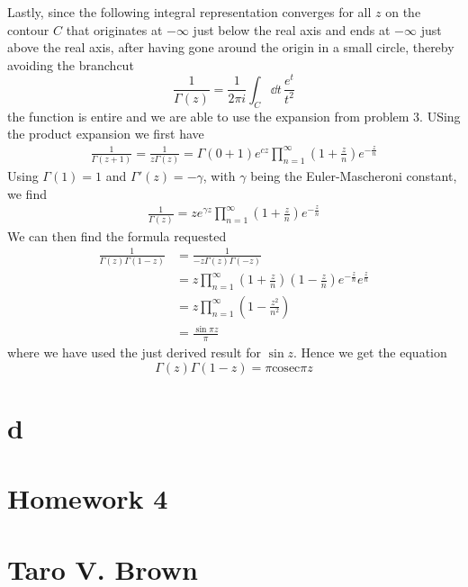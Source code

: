 \documentclass[a4paper,12pt]{article}
\begin{document}
Lastly, since the following integral representation converges for all $z$ on the contour $C$ that originates at $-\infty$ just below the real axis and ends at $-\infty$ just above the real axis, after having gone around the origin in a small circle, thereby avoiding the branchcut
\begin{equation}
\frac{1}{\Gamma(z)}=\frac{1}{2\pi i}\int_C\dd t\, \frac{e^t}{t^2}
\end{equation}
the function is entire and we are able to use the expansion from problem 3. USing the product expansion we first have
\begin{equation}
\begin{aligned}
\frac{1}{\Gamma(z+1)}=\frac{1}{z\Gamma(z)}=\Gamma(0+1)e^{cz}\prod_{n=1}^{\infty}\left(1+\frac{z}{n}\right)e^{-\frac{z}{n}}
\end{aligned}
\end{equation}
Using $\Gamma(1)=1$ and $\Gamma'(z)=-\gamma$, with $\gamma $ being the Euler-Mascheroni constant, we find
\begin{equation}
	\begin{aligned}
\frac{1}{\Gamma(z)}=ze^{\gamma z}\prod_{n=1}^{\infty}\left(1+\frac{z}{n}\right)e^{-\frac{z}{n}}
	\end{aligned}
\end{equation}
We can then find the formula requested
\begin{equation}
\begin{aligned}
\frac{1}{\Gamma(z)\Gamma(1-z)}&=
\frac{1}{-z\Gamma(z)\Gamma(-z)}\\
&=z\prod_{n=1}^{\infty}\left(1+\frac{z}{n}\right)\left(1-\frac{z}{n}\right)e^{-\frac{z}{n}}e^{\frac{z}{n}}\\
&=z\prod_{n=1}^{\infty}\left(1-\frac{z^2}{n^2}\right)\\
&=\frac{\sin \pi z}{\pi}
\end{aligned}
\end{equation}
where we have used the just derived result for $\sin z$. Hence we get the equation
\begin{equation}
\Gamma(z)\Gamma(1-z)=\pi\text{cosec} \pi z
\end{equation}
\newpage
\section{d}
\section*{Homework 4\\\\
	Taro V. Brown}\vspace*{1cm}
\end{document}
